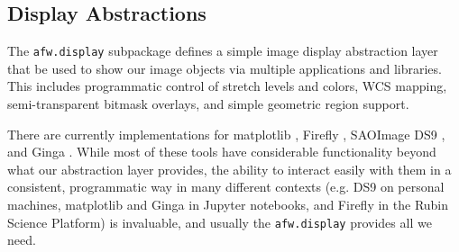 \subsection{Display Abstractions}
\label{sec:display}

The \texttt{afw.display} subpackage defines a simple image display abstraction layer that be used to show our image objects via multiple applications and libraries.
This includes programmatic control of stretch levels and colors, WCS mapping, semi-transparent bitmask overlays, and simple geometric region support.

There are currently implementations for matplotlib \citep{2007CSE.....9...90H}, Firefly \citep{2020ASPC..527..243R}, SAOImage DS9 \citep{2003ASPC..295..489J}, and Ginga \citep[][via Astrowidgets]{2013ASPC..475..319J}.
While most of these tools have considerable functionality beyond what our abstraction layer provides, the ability to interact easily with them in a consistent, programmatic way in many different contexts (e.g. DS9 on personal machines, matplotlib and Ginga in Jupyter notebooks, and Firefly in the Rubin Science Platform) is invaluable, and usually the \texttt{afw.display} provides all we need.
